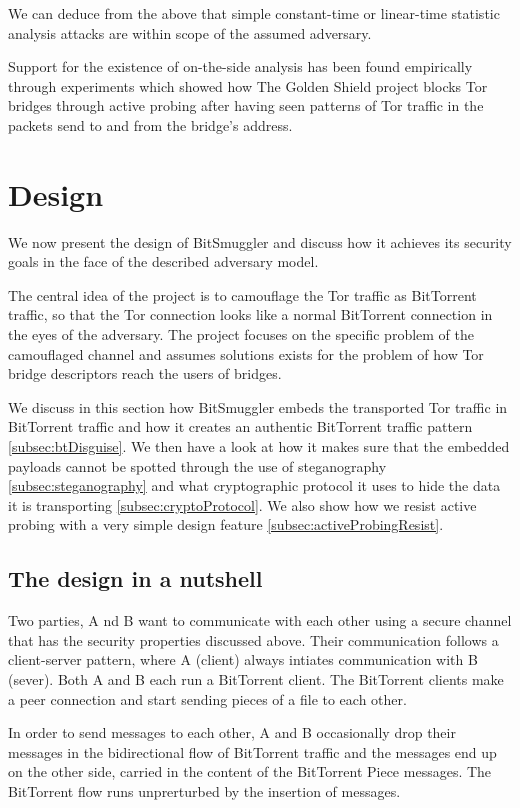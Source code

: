 \documentclass[11pt]{article} %
\newcommand{\projectName}{BitSmuggler }
\begin{document}
We can deduce from the above that simple constant-time  or linear-time statistic analysis attacks are within scope of the assumed adversary.

Support for the existence of on-the-side analysis has been found empirically through experiments which showed how The Golden Shield project blocks Tor bridges through active probing after having seen patterns of Tor traffic in the packets send to and from the bridge's address.

\section{Design}
We now present the design of  \projectName and discuss how it achieves its security goals in the face of the described adversary model.

The central idea of the project is to camouflage the Tor traffic as BitTorrent traffic, so that the Tor connection looks like a normal BitTorrent connection in the eyes of the adversary. The project focuses on the specific problem of the camouflaged channel and assumes solutions exists for the problem of how Tor bridge descriptors reach the users of bridges.

We discuss in this section how \projectName embeds the transported Tor traffic in BitTorrent traffic and how it creates an authentic BitTorrent traffic pattern  \ref{subsec:btDisguise}. We then have a look at how it makes sure that the embedded payloads cannot be spotted through the use of steganography  \ref{subsec:steganography} and what cryptographic protocol it uses to hide the data it is transporting  \ref{subsec:cryptoProtocol}. We also show how we resist active probing with a very simple design feature 
 \ref{subsec:activeProbingResist}.

\subsection{The design in a nutshell}

Two parties, A nd B want to communicate with each other using a secure channel that has the security properties discussed above.  Their communication follows a client-server pattern, where A (client) always intiates communication with B (sever). Both A and B each run a BitTorrent client. The BitTorrent clients make a peer connection and start sending pieces of a file to each other.

In order to send messages to each other, A and B occasionally drop their messages in the bidirectional flow of BitTorrent traffic and the messages end up on the other side, carried in the content of the BitTorrent Piece messages. The BitTorrent flow runs unprerturbed by the insertion of messages. 
\end{document}
